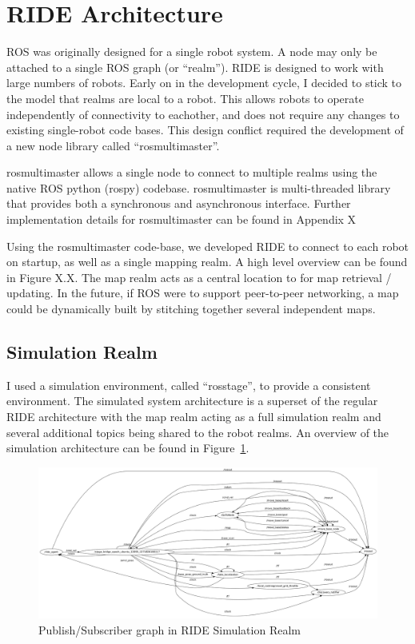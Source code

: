 \section{RIDE Architecture}

ROS was originally designed for a single robot system. A node may only be attached to a single ROS graph (or ``realm''). RIDE is designed to work with large numbers of robots. Early on in the development cycle, I decided to stick to the model that realms are local to a robot. This allows robots to operate independently of connectivity to eachother, and does not require any changes to existing single-robot code bases. This design conflict required the development of a new node library called ``rosmultimaster''.

rosmultimaster allows a single node to connect to multiple realms using the native ROS python (rospy) codebase. rosmultimaster is multi-threaded library that provides both a synchronous and asynchronous interface. Further implementation details for rosmultimaster can be found in Appendix X %

Using the rosmultimaster code-base, we developed RIDE to connect to each robot on startup, as well as a single mapping realm. A high level overview can be found in Figure X.X. The map realm acts as a central location to for map retrieval / updating. In the future, if ROS were to support peer-to-peer networking, a map could be dynamically built by stitching together several independent maps. 


\subsection{Simulation Realm}
\label{sub:simulator}
I used a simulation environment, called ``rosstage'', to provide a consistent environment. The simulated system architecture is a superset of the regular RIDE architecture with the map realm acting as a full simulation realm and several additional topics being shared to the robot realms. An overview of the simulation architecture can be found in Figure~\ref{fig:ride-simulation-realm}.

\begin{figure}
\includegraphics[width=\textwidth]{images/ride-simulation-realm.png}
\caption{Publish/Subscriber graph in RIDE Simulation Realm\label{fig:ride-simulation-realm}}
\end{figure}

